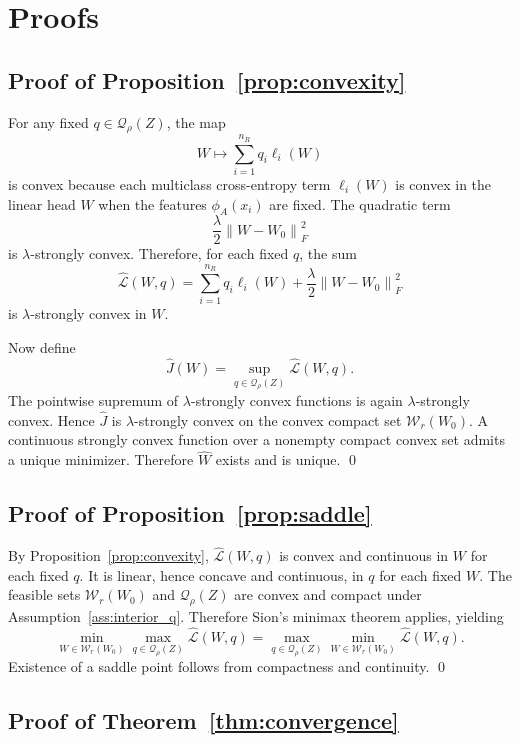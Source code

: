 \documentclass{article}
\newcommand{\cQ}{\mathcal{Q}}
\newcommand{\cW}{\mathcal{W}}
\newcommand{\1}{\mathbbm{1}}
\newcommand{\norm}[1]{\left\lVert #1 \right\rVert}
\newcommand{\loss}{\ell}
\begin{document}
\section{Proofs}

\subsection{Proof of Proposition~\ref{prop:convexity}}

For any fixed \(q\in\cQ_\rho(Z)\), the map
\[
    W \mapsto \sum_{i=1}^{n_R} q_i \loss_i(W)
\]
is convex because each multiclass cross-entropy term \(\loss_i(W)\) is convex in the linear head \(W\) when the features \(\phi_A(x_i)\) are fixed. The quadratic term
\[
    \frac{\lambda}{2}\norm{W-W_0}_F^2
\]
is \(\lambda\)-strongly convex. Therefore, for each fixed \(q\), the sum
\[
    \widehat{\mathcal L}(W,q)
    =
    \sum_{i=1}^{n_R} q_i \loss_i(W)
    +
    \frac{\lambda}{2}\norm{W-W_0}_F^2
\]
is \(\lambda\)-strongly convex in \(W\).

Now define
\[
    \widehat J(W)
    =
    \sup_{q\in\cQ_\rho(Z)} \widehat{\mathcal L}(W,q).
\]
The pointwise supremum of \(\lambda\)-strongly convex functions is again \(\lambda\)-strongly convex. Hence \(\widehat J\) is \(\lambda\)-strongly convex on the convex compact set \(\cW_r(W_0)\). A continuous strongly convex function over a nonempty compact convex set admits a unique minimizer. Therefore \(\widehat W\) exists and is unique.
\qed

\subsection{Proof of Proposition~\ref{prop:saddle}}

By Proposition~\ref{prop:convexity}, \(\widehat{\mathcal L}(W,q)\) is convex and continuous in \(W\) for each fixed \(q\). It is linear, hence concave and continuous, in \(q\) for each fixed \(W\). The feasible sets \(\cW_r(W_0)\) and \(\cQ_\rho(Z)\) are convex and compact under Assumption~\ref{ass:interior_q}. Therefore Sion's minimax theorem applies, yielding
\[
    \min_{W\in\cW_r(W_0)} \max_{q\in\cQ_\rho(Z)} \widehat{\mathcal L}(W,q)
    =
    \max_{q\in\cQ_\rho(Z)} \min_{W\in\cW_r(W_0)} \widehat{\mathcal L}(W,q).
\]
Existence of a saddle point follows from compactness and continuity.
\qed

\subsection{Proof of Theorem~\ref{thm:convergence}}
\end{document}
